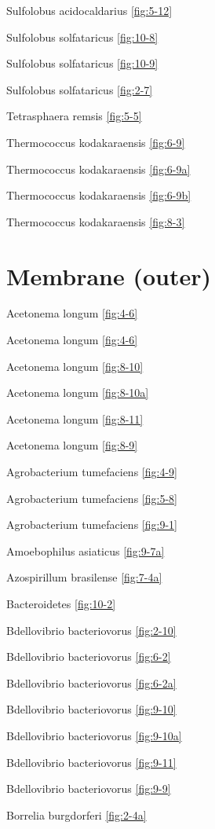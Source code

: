 \documentclass[]{tufte-book}
\begin{document}
Sulfolobus acidocaldarius \ref{fig:5-12}

Sulfolobus solfataricus \ref{fig:10-8}

Sulfolobus solfataricus \ref{fig:10-9}

Sulfolobus solfataricus \ref{fig:2-7}

Tetrasphaera remsis \ref{fig:5-5}

Thermococcus kodakaraensis \ref{fig:6-9}

Thermococcus kodakaraensis \ref{fig:6-9a}

Thermococcus kodakaraensis \ref{fig:6-9b}

Thermococcus kodakaraensis \ref{fig:8-3}

\hypertarget{membrane-outer}{%
\section*{Membrane (outer)}\label{membrane-outer}}

Acetonema longum \ref{fig:4-6}

Acetonema longum \ref{fig:4-6}

Acetonema longum \ref{fig:8-10}

Acetonema longum \ref{fig:8-10a}

Acetonema longum \ref{fig:8-11}

Acetonema longum \ref{fig:8-9}

Agrobacterium tumefaciens \ref{fig:4-9}

Agrobacterium tumefaciens \ref{fig:5-8}

Agrobacterium tumefaciens \ref{fig:9-1}

Amoebophilus asiaticus \ref{fig:9-7a}

Azospirillum brasilense \ref{fig:7-4a}

Bacteroidetes \ref{fig:10-2}

Bdellovibrio bacteriovorus \ref{fig:2-10}

Bdellovibrio bacteriovorus \ref{fig:6-2}

Bdellovibrio bacteriovorus \ref{fig:6-2a}

Bdellovibrio bacteriovorus \ref{fig:9-10}

Bdellovibrio bacteriovorus \ref{fig:9-10a}

Bdellovibrio bacteriovorus \ref{fig:9-11}

Bdellovibrio bacteriovorus \ref{fig:9-9}

Borrelia burgdorferi \ref{fig:2-4a}
\end{document}
